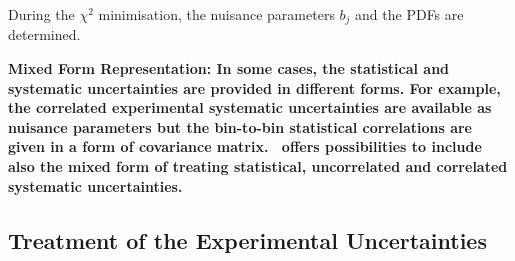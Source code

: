 \begin{description}
During the $\chi^2$ minimisation, the nuisance parameters $b_j$ and the PDFs are determined. 
\item  \bf{Mixed Form Representation:} \rm
In some cases, the statistical and systematic uncertainties are provided in different forms.    
For example, the correlated experimental systematic uncertainties are available as nuisance parameters
but the bin-to-bin statistical correlations are given in a form of covariance matrix.
\fitter\ offers possibilities to include also the mixed 
form of treating statistical, uncorrelated and correlated systematic uncertainties. 
\end{description}


\subsection{Treatment of the Experimental Uncertainties}
\label{sec:experimentalerrors}


